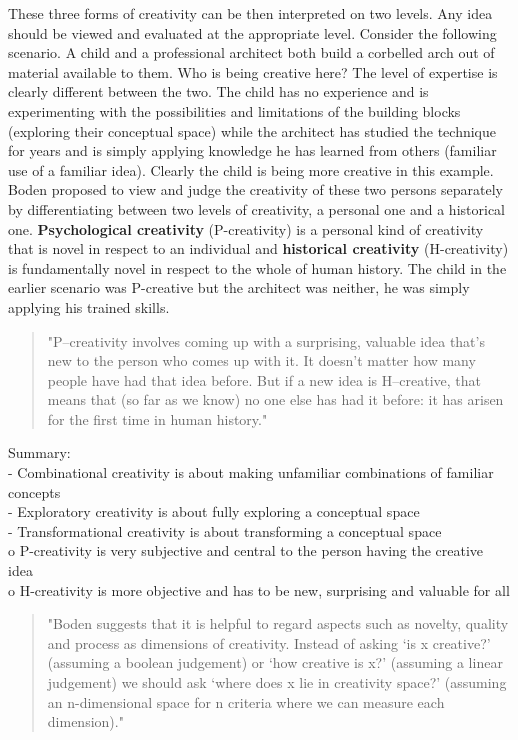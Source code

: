 These three forms of creativity can be then interpreted on two levels. Any idea should be viewed and evaluated at the appropriate level. Consider the following scenario. A child and a professional architect both build a corbelled arch out of material available to them. Who is being creative here? The level of expertise is clearly different between the two. The child has no experience and is experimenting with the possibilities and limitations of the building blocks (exploring their conceptual space) while the architect has studied the technique for years and is simply applying knowledge he has learned from others (familiar use of a familiar idea). Clearly the child is being more creative in this example. Boden proposed to view and judge the creativity of these two persons separately by differentiating between two levels of creativity, a personal one and a historical one. \textbf{Psychological creativity} (P-creativity) is a personal kind of creativity that is novel in respect to an individual and \textbf{historical creativity} (H-creativity) is fundamentally novel in respect to the whole of human history. The child in the earlier scenario was P-creative but the architect was neither, he was simply applying his trained skills.

\begin{quote}
	"P–creativity involves coming up with a surprising, valuable idea that’s new to the person who comes up with it. It doesn’t matter how many people have had that idea before. But if a new idea is H–creative, that means that (so far as we know) no one else has had it before: it has arisen for the first time in human history." \citep{Boden2003}
\end{quote}

\begin{shaded}
Summary:\\
-	Combinational creativity is about making unfamiliar combinations of familiar concepts\\
-	Exploratory creativity is about fully exploring a conceptual space\\
-	Transformational creativity is about transforming a conceptual space\\
o	P-creativity is very subjective and central to the person having the creative idea\\
o	H-creativity is more objective and has to be new, surprising and valuable for all
\end{shaded}

\begin{quote}
"Boden suggests that it is helpful to regard aspects such as novelty, quality and process as dimensions of creativity. Instead of asking ‘is x creative?’ (assuming a boolean judgement) or ‘how creative is x?’ (assuming a linear judgement) we should ask ‘where does x lie in creativity space?’ (assuming an n-dimensional space for n criteria where we can measure each dimension)." \citep[p.8]{Pease2001}
\end{quote}

